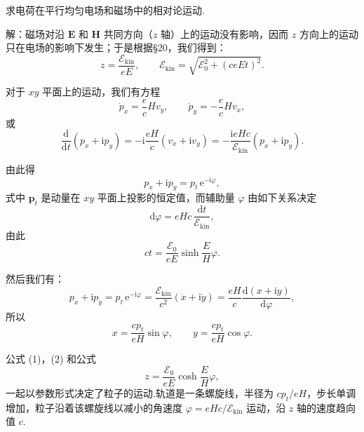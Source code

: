 \begin{xiti}

\quad 求电荷在平行均匀电场和磁场中的相对论运动.

解：磁场对沿 $\boldsymbol{E}$ 和 $\boldsymbol{H}$ 共同方向（$z$ 轴）上的运动没有影响，因而 $z$
方向上的运动只在电场的影响下发生；于是根据§20，我们得到：
\begin{equation*}
  z=\frac{\mathcal{E}_\mathrm{kin}}{eE},\qquad
  \mathcal{E}_\mathrm{kin}=\sqrt{\mathcal{E}_0^2+(ceEt)^2}.
\end{equation*}

对于 $xy$ 平面上的运动，我们有方程
\begin{equation*}
  \dot{p}_x=\frac{e}{c}Hv_y,\qquad
  \dot{p}_y=-\frac{e}{c}Hv_x,
\end{equation*}
或
\begin{equation*}
  \frac{\mathrm{d}}{\mathrm{d}t}\left(p_x+\mathrm{i}p_y\right)
  =-\mathrm{i}\frac{eH}{c}\left(v_x+\mathrm{i}v_y\right)
  =-\frac{\mathrm{i}eHc}{\mathcal{E}_\mathrm{kin}}\left(p_x+\mathrm{i}p_y\right).
\end{equation*}

由此得
\begin{equation*}
  p_x+\mathrm{i}p_y=p_t\,\mathrm{e}^{-\mathrm{i}\varphi},
\end{equation*}
式中 $\boldsymbol{p}_t$ 是动量在 $xy$ 平面上投影的恒定值，而辅助量 $\varphi$ 由如下关系决定
\begin{equation*}
  \mathrm{d}\varphi=eHc\,\frac{\mathrm{d}t}{\mathcal{E}_\mathrm{kin}},
\end{equation*}
由此
\begin{equation*}
  ct=\frac{\mathcal{E}_0}{eE}\sinh\frac{E}{H}\varphi.\tag{1}
\end{equation*}

然后我们有：
\begin{equation*}
  p_x+\mathrm{i}p_y=p_t\,\mathrm{e}^{-\mathrm{i}\varphi}
  =\frac{\mathcal{E}_\mathrm{kin}}{c^2}\left(\dot{x}+\mathrm{i}\dot{y}\right)
  =\frac{eH}{c}\frac{\mathrm{d}(x+\mathrm{i}y)}{\mathrm{d}\varphi},
\end{equation*}
所以
\begin{equation*}
  x=\frac{cp_t}{eH}\sin\varphi,\qquad
  y=\frac{cp_t}{eH}\cos\varphi.\tag{2}
\end{equation*}

公式 (1)，(2) 和公式
\begin{equation*}
  z=\frac{\mathcal{E}_0}{eE}\cosh\frac{E}{H}\varphi,\tag{3}
\end{equation*}
一起以参数形式决定了粒子的运动.轨道是一条螺旋线，半径为 $cp_t/eH$，步长单调增加，粒子沿着该螺旋线以减小的角速度
$\varphi=eHc/\mathcal{E}_\mathrm{kin}$ 运动，沿 $z$ 轴的速度趋向值 $c$.


\end{xiti}
